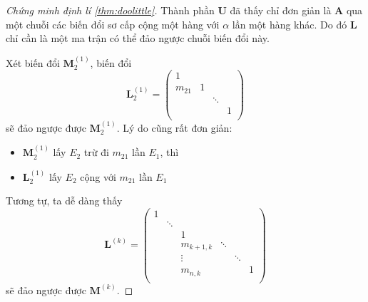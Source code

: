 \documentclass[../../Lectures]{subfiles}
\begin{document}
\begin{proof}[Chứng minh định lí \ref{thm:doolittle}]
    Thành phần \(\bm{U}\) đã thấy chỉ đơn giản là \(\bm{A}\) qua một chuỗi các
    biến đổi sơ cấp cộng một hàng với \(\alpha\) lần một hàng khác. Do đó
    \(\bm{L}\) chỉ cần là một ma trận có thể đảo ngược chuỗi biến đổi này.

    Xét biến đổi \(\bm{M}_2^{(1)}\), biến đổi
    \[
        \bm{L}_2^{(1)} =
            \begin{pmatrix}
                    1   &     &          &     \\
                m_{21}  &  1  &          &     \\
                        &     &  \ddots  &     \\
                        &     &          &  1  \\
            \end{pmatrix}
    \]
    sẽ đảo ngược được \(\bm{M}_2^{(1)}\). Lý do cũng rất đơn giản:
    \begin{itemize}
        \item \(\bm{M}_2^{(1)}\) lấy \(E_2\) trừ đi \(m_{21}\) lần \(E_1\), thì
        \item \(\bm{L}_2^{(1)}\) lấy \(E_2\) cộng với \(m_{21}\) lần \(E_1\)
    \end{itemize}

    Tương tự, ta dễ dàng thấy
    \[
        \bm{L}^{(k)} =
            \begin{pmatrix}
                1  &          &                &          &          &     \\
                   &  \ddots  &                &          &          &     \\
                   &          &        1       &          &          &     \\
                   &          &  m_{k + 1, k}  &  \ddots  &          &     \\
                   &          &     \vdots     &          &  \ddots  &     \\
                   &          &  m_{n, k}      &          &          &  1  \\
            \end{pmatrix}
    \]
    sẽ đảo ngược được \(\bm{M}^{(k)}\).


\end{proof}
\end{document}
